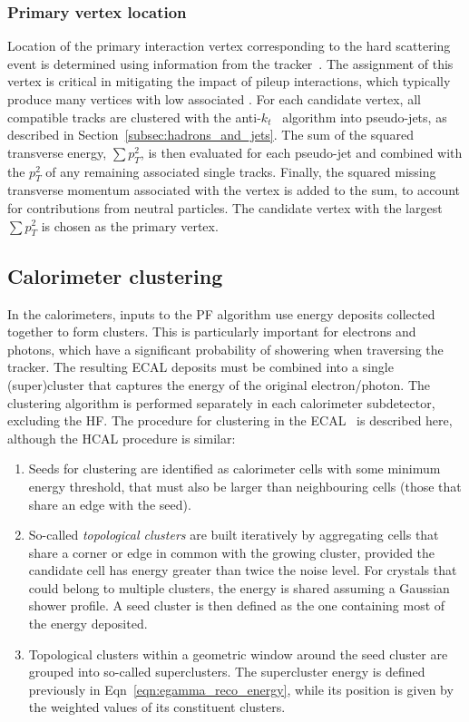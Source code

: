 \subsubsection{Primary vertex location}


Location of the primary interaction vertex corresponding to the hard scattering event is determined using information from the tracker~\cite{primary_vertex_finding}. The assignment of this vertex is critical in mitigating the impact of pileup interactions, which typically produce many vertices with low associated \pt. For each candidate vertex, all compatible tracks are clustered with the anti-$k_{t}$~\cite{anti-kt} algorithm into pseudo-jets, as described in Section~\ref{subsec:hadrons_and_jets}. The sum of the squared transverse energy, $\sum p^{2}_{T}$, is then evaluated for each pseudo-jet and combined with the $p^{2}_{T}$ of any remaining associated single tracks. Finally, the squared missing transverse momentum associated with the vertex is added to the sum, to account for contributions from neutral particles. The candidate vertex with the largest $\sum p^{2}_{T}$ is chosen as the primary vertex.

\subsection{Calorimeter clustering}

In the calorimeters, inputs to the PF algorithm use energy deposits collected together to form clusters. This is particularly important for electrons and photons, which have a significant probability of showering when traversing the tracker. The resulting ECAL deposits must be combined into a single (super)cluster that captures the energy of the original electron/photon. The clustering algorithm is performed separately in each calorimeter subdetector, excluding the HF. The procedure for clustering in the ECAL~\cite{particle_flow,CMS_egamma_performance} is described here, although the HCAL procedure is similar:

\begin{enumerate}
    \item Seeds for clustering are identified as calorimeter cells with some minimum energy threshold, that must also be larger than neighbouring cells (those that share an edge with the seed).
    \item So-called \textit{topological clusters} are built iteratively by aggregating cells that share a corner or edge in common with the growing cluster, provided the candidate cell has energy greater than twice the noise level. For crystals that could belong to multiple clusters, the energy is shared assuming a Gaussian shower profile. A seed cluster is then defined as the one containing most of the energy deposited.
    \item Topological clusters within a geometric window around the seed cluster are grouped into so-called superclusters. The supercluster energy is defined previously in Eqn~\ref{eqn:egamma_reco_energy}, while its position is given by the \pt weighted values of its constituent clusters. 
\end{enumerate}

